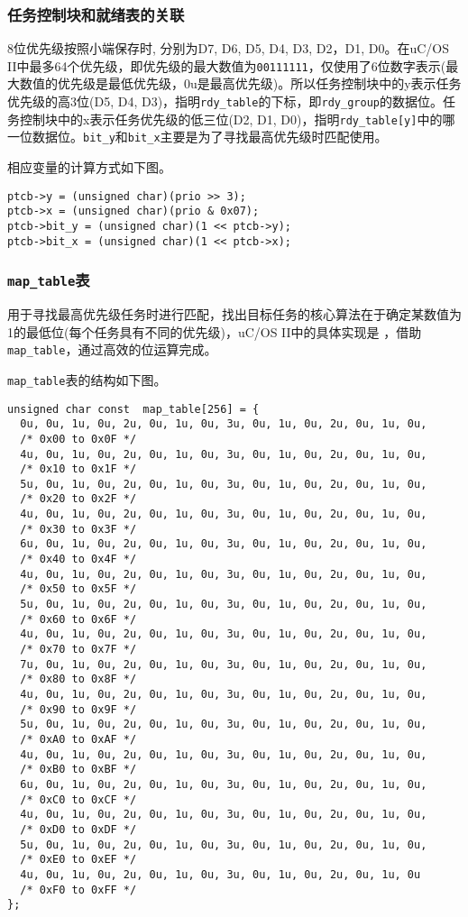 \subsubsection{任务控制块和就绪表的关联}

8位优先级按照小端保存时, 分别为D7, D6, D5, D4, D3, D2，D1, D0。在uC/OS II中最多64个优先级，即优先级的最大数值为\texttt{00111111}，仅使用了6位数字表示(最大数值的优先级是最低优先级，0u是最高优先级)。所以任务控制块中的y表示任务优先级的高3位(D5, D4, D3)，指明\texttt{rdy\_table}的下标，即\texttt{rdy\_group}的数据位。任务控制块中的x表示任务优先级的低三位(D2, D1, D0)，指明\texttt{rdy\_table[y]}中的哪一位数据位。\texttt{bit\_y}和\texttt{bit\_x}主要是为了寻找最高优先级时匹配使用。

相应变量的计算方式如下图。


\begin{lstlisting}[caption=相关位运算]
ptcb->y = (unsigned char)(prio >> 3);
ptcb->x = (unsigned char)(prio & 0x07);
ptcb->bit_y = (unsigned char)(1 << ptcb->y);
ptcb->bit_x = (unsigned char)(1 << ptcb->x);
\end{lstlisting}


\subsubsection{\texttt{map\_table}表}
用于寻找最高优先级任务时进行匹配，找出目标任务的核心算法在于确定某数值为1的最低位(每个任务具有不同的优先级)，uC/OS II中的具体实现是 ，借助\texttt{map\_table}，通过高效的位运算完成。

\texttt{map\_table}表的结构如下图。

\begin{lstlisting}[caption=\texttt{map\_table}表]
unsigned char const  map_table[256] = {
  0u, 0u, 1u, 0u, 2u, 0u, 1u, 0u, 3u, 0u, 1u, 0u, 2u, 0u, 1u, 0u, 
  /* 0x00 to 0x0F */
  4u, 0u, 1u, 0u, 2u, 0u, 1u, 0u, 3u, 0u, 1u, 0u, 2u, 0u, 1u, 0u,
  /* 0x10 to 0x1F */
  5u, 0u, 1u, 0u, 2u, 0u, 1u, 0u, 3u, 0u, 1u, 0u, 2u, 0u, 1u, 0u, 
  /* 0x20 to 0x2F */
  4u, 0u, 1u, 0u, 2u, 0u, 1u, 0u, 3u, 0u, 1u, 0u, 2u, 0u, 1u, 0u, 
  /* 0x30 to 0x3F */
  6u, 0u, 1u, 0u, 2u, 0u, 1u, 0u, 3u, 0u, 1u, 0u, 2u, 0u, 1u, 0u, 
  /* 0x40 to 0x4F */
  4u, 0u, 1u, 0u, 2u, 0u, 1u, 0u, 3u, 0u, 1u, 0u, 2u, 0u, 1u, 0u, 
  /* 0x50 to 0x5F */
  5u, 0u, 1u, 0u, 2u, 0u, 1u, 0u, 3u, 0u, 1u, 0u, 2u, 0u, 1u, 0u, 
  /* 0x60 to 0x6F */
  4u, 0u, 1u, 0u, 2u, 0u, 1u, 0u, 3u, 0u, 1u, 0u, 2u, 0u, 1u, 0u, 
  /* 0x70 to 0x7F */
  7u, 0u, 1u, 0u, 2u, 0u, 1u, 0u, 3u, 0u, 1u, 0u, 2u, 0u, 1u, 0u, 
  /* 0x80 to 0x8F */
  4u, 0u, 1u, 0u, 2u, 0u, 1u, 0u, 3u, 0u, 1u, 0u, 2u, 0u, 1u, 0u,
  /* 0x90 to 0x9F */
  5u, 0u, 1u, 0u, 2u, 0u, 1u, 0u, 3u, 0u, 1u, 0u, 2u, 0u, 1u, 0u, 
  /* 0xA0 to 0xAF */
  4u, 0u, 1u, 0u, 2u, 0u, 1u, 0u, 3u, 0u, 1u, 0u, 2u, 0u, 1u, 0u,
  /* 0xB0 to 0xBF */
  6u, 0u, 1u, 0u, 2u, 0u, 1u, 0u, 3u, 0u, 1u, 0u, 2u, 0u, 1u, 0u,
  /* 0xC0 to 0xCF */
  4u, 0u, 1u, 0u, 2u, 0u, 1u, 0u, 3u, 0u, 1u, 0u, 2u, 0u, 1u, 0u,
  /* 0xD0 to 0xDF */
  5u, 0u, 1u, 0u, 2u, 0u, 1u, 0u, 3u, 0u, 1u, 0u, 2u, 0u, 1u, 0u,
  /* 0xE0 to 0xEF */
  4u, 0u, 1u, 0u, 2u, 0u, 1u, 0u, 3u, 0u, 1u, 0u, 2u, 0u, 1u, 0u 
  /* 0xF0 to 0xFF */
};
\end{lstlisting}





